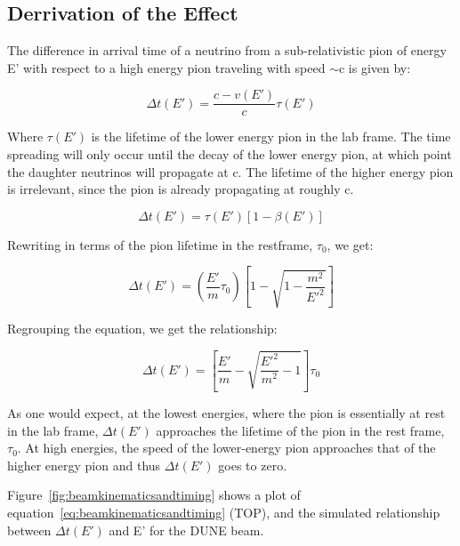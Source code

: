\subsection{Derrivation of the Effect}
\label{mechanism}

The difference in arrival time of a neutrino from a sub-relativistic
pion of energy E' with respect to a high energy pion traveling with
speed $\sim$c is given by:

\begin{equation}
\Delta t(E') = \frac{c - v(E')}{c} \tau (E')
\end{equation}

Where $\tau (E')$ is the lifetime of the lower energy pion in the lab
frame. The time spreading will only occur until the decay of the lower
energy pion, at which point the daughter neutrinos will propagate at
c. The lifetime of the higher energy pion is irrelevant, since the
pion is already propagating at roughly c.

\begin{equation}
\Delta t(E') = \tau (E') [1 - \beta (E')]
\end{equation}

Rewriting in terms of the pion lifetime in the restframe, $\tau_0$, we get:

\begin{equation}
\Delta t(E') = \left(\frac{E'}{m} \tau_0\right) \left[1 - \sqrt{ 1 - \frac{m^2}{E'^2}} \right] 
\end{equation}

Regrouping the equation, we get the relationship:

\begin{equation}
\Delta t(E') = \left[\frac{E'}{m} - \sqrt{ \frac{E'^2}{m^2} - 1}\right] \tau_0
\label{eq:beamkinematicsandtiming}
\end{equation}

As one would expect, at the lowest energies, where the pion is
essentially at rest in the lab frame, $\Delta t(E')$ approaches the
lifetime of the pion in the rest frame, $\tau_0$. At high energies,
the speed of the lower-energy pion approaches that of the higher
energy pion and thus $\Delta t(E')$ goes to zero.

Figure~\ref{fig:beamkinematicsandtiming} shows a plot of
equation~\ref{eq:beamkinematicsandtiming} (TOP), and the simulated
relationship between $\Delta t(E')$ and E' for the DUNE beam.

